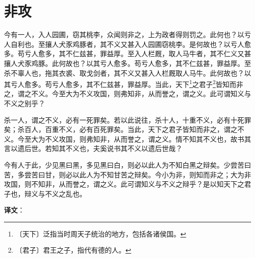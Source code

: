 \documentclass[12pt,UTF-8,openany,a4]{ctexbook}
\begin{document}
\chapter{非攻}

\begin{large}
    
    今有一人，入人园圃，窃其桃李，众闻则非之，上为政者得则罚之。此何也？以亏人自利也。至攘人犬豕鸡豚者，其不义又甚入人园圃窃桃李。是何故也？以亏人愈多。苟亏人愈多，其不仁兹甚，罪益厚。至入人栏厩，取人马牛者，其不仁义又甚攘人犬豕鸡豚。此何故也？以其亏人愈多。苟亏人愈多，其不仁兹甚，罪益厚。至杀不辜人也，拖其衣裘、取戈剑者，其不义又甚入人栏厩取人马牛。此何故也？以其亏人愈多。苟亏人愈多，其不仁兹甚，罪益厚。当此，天下\footnote{〔天下〕\yiwen 泛指当时周天子统治的地方，包括各诸侯国。}之君子\footnote{〔君子〕\yiwen 君王之子，指代有德的人。}皆知而非之，谓之不义。今至大为不义攻国，则弗知非，从而誉之，谓之义。此可谓知义与不义之别乎？
    
    杀一人，谓之不义，必有一死罪矣。若以此说往，杀十人，十重不义，必有十死罪矣；杀百人，百重不义，必有百死罪矣。当此，天下之君子皆知而非之，谓之不义。今至大为不义攻国，则弗知非，从而誉之，谓之义。情不知其不义也，故书其言以遗后世。若知其不义也，夫奚说书其不义以遗后世哉？
    
    今有人于此，少见黑曰黑，多见黑曰白，则必以此人为不知白黑之辩矣。少尝苦曰苦，多尝苦曰甘，则必以此人为不知甘苦之辩矣。今小为非，则知而非之；大为非攻国，则不知非，从而誉之，谓之义。此可谓知义与不义之辩乎？是以知天下之君子也，辩义与不义之乱也。

\end{large}


\newpage

\begin{Large}
   \noindent \textbf{译文}：
\end{Large}

\vspace{1em}
\end{document}
